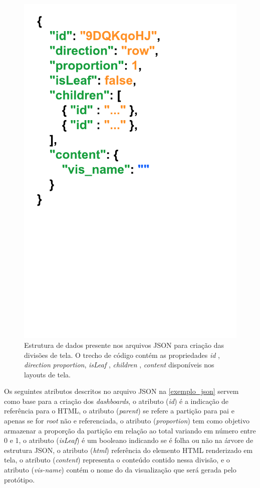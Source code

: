 \documentclass[
	12pt,				%
	openright,			%
	oneside,			%
	a4paper,			%
	english,			%
	brazil				%
	]{abntex2}
\begin{document}
\begin{figure}
	\caption{\label{exemplo_json}
	Estrutura de dados presente nos arquivos JSON para criação das divisões de tela. O trecho de código contém as propriedades \textit{id} , \textit{direction}  \textit{proportion},  \textit{isLeaf} , \textit{children} , \textit{content} disponíveis nos layouts de tela.
	}
	\begin{center}
	    \includegraphics[width=\textwidth/3,size=0.5,trim={0mm 65mm, 20mm 0mm}]{figures/jsonFormat.pdf}
	\end{center}
\end{figure}

Os seguintes atributos descritos  no arquivo JSON na \autoref{exemplo_json} servem como base para a criação dos \textit{dashboards}, o atributo (\textit{id}) é a indicação de referência para o HTML, o atributo (\textit{parent}) se refere a partição para pai e apenas se for \textit{root} não e referenciada, o atributo (\textit{proportion}) tem como objetivo armazenar a proporção da partição em relação ao total variando em número entre 0 e 1, o atributo (\textit{isLeaf}) é um booleano indicando se é folha ou não na árvore de estrutura JSON, o atributo (\textit{html}) referência do elemento HTML renderizado em tela, o atributo (\textit{content}) representa o conteúdo contido nessa divisão, e o atributo (\textit{vis-name}) contém o nome do da visualização que será gerada pelo protótipo.
\end{document}
